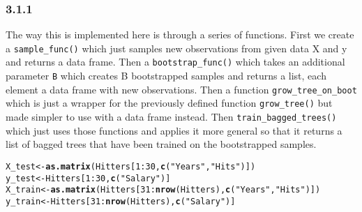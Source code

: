 \documentclass[10pt, a4paper, english]{article}\usepackage[]{graphicx}\usepackage[dvipsnames]{xcolor}
\makeatletter
\newcommand{\hlnum}[1]{\textcolor[rgb]{0.686,0.059,0.569}{#1}}%
\newcommand{\hlstr}[1]{\textcolor[rgb]{0.192,0.494,0.8}{#1}}%
\newcommand{\hlopt}[1]{\textcolor[rgb]{0,0,0}{#1}}%
\newcommand{\hlstd}[1]{\textcolor[rgb]{0.345,0.345,0.345}{#1}}%
\newcommand{\hlkwb}[1]{\textcolor[rgb]{0.69,0.353,0.396}{#1}}%
\newcommand{\hlkwd}[1]{\textcolor[rgb]{0.737,0.353,0.396}{\textbf{#1}}}%
\newenvironment{kframe}{%
 \def\at@end@of@kframe{}%
 \ifinner\ifhmode%
  \def\at@end@of@kframe{\end{minipage}}%
  \begin{minipage}{\columnwidth}%
 \fi\fi%
 \def\FrameCommand##1{\hskip\@totalleftmargin \hskip-\fboxsep
 \colorbox{shadecolor}{##1}\hskip-\fboxsep
     \hskip-\linewidth \hskip-\@totalleftmargin \hskip\columnwidth}%
 \MakeFramed {\advance\hsize-\width
   \@totalleftmargin\z@ \linewidth\hsize
   \@setminipage}}%
 {\par\unskip\endMakeFramed%
 \at@end@of@kframe}
\newenvironment{knitrout}{}{} %
\makeatother
\begin{document}
\subsubsection{3.1.1}
The way this is implemented here is through a series of functions. First we
create a \texttt{sample\_func()} which just samples new observations from given data X and y and returns a data frame. Then a \texttt{bootstrap\_func()} which takes an additional parameter \texttt{B} which creates B bootstrapped samples and returns a list, each element a data frame with new observations. Then a function \texttt{grow\_tree\_on\_boot} which is just a wrapper for the previously defined function \texttt{grow\_tree()} but made simpler to use with a data frame instead.
Then \texttt{train\_bagged\_trees()} which just uses those functions and applies it more general so that it returns a list of bagged trees that have been trained on the bootstrapped samples.
\begin{knitrout}
\color{fgcolor}\begin{kframe}
\begin{alltt}
\hlstd{X_test} \hlkwb{<-} \hlkwd{as.matrix}\hlstd{(Hitters[}\hlnum{1}\hlopt{:}\hlnum{30}\hlstd{,} \hlkwd{c}\hlstd{(}\hlstr{"Years"}\hlstd{,} \hlstr{"Hits"}\hlstd{)])}
\hlstd{y_test} \hlkwb{<-} \hlstd{Hitters[}\hlnum{1}\hlopt{:}\hlnum{30}\hlstd{,} \hlkwd{c}\hlstd{(}\hlstr{"Salary"}\hlstd{)]}
\hlstd{X_train} \hlkwb{<-} \hlkwd{as.matrix}\hlstd{(Hitters[}\hlnum{31}\hlopt{:}\hlkwd{nrow}\hlstd{(Hitters),} \hlkwd{c}\hlstd{(}\hlstr{"Years"}\hlstd{,} \hlstr{"Hits"}\hlstd{)])}
\hlstd{y_train} \hlkwb{<-} \hlstd{Hitters[}\hlnum{31}\hlopt{:}\hlkwd{nrow}\hlstd{(Hitters),} \hlkwd{c}\hlstd{(}\hlstr{"Salary"}\hlstd{)]}
\end{alltt}
\end{kframe}
\end{knitrout}
\end{document}
